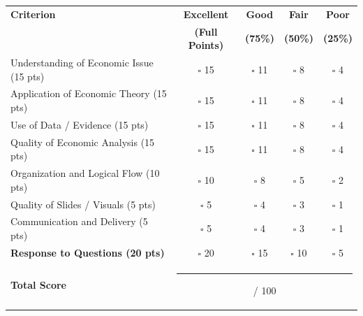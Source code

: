 \documentclass[12pt]{article}
\begin{document}
\begin{center}

\renewcommand{\arraystretch}{1.4}

\begin{tabular}{p{6cm}cccc}
\toprule
\textbf{Criterion} & \textbf{Excellent} & \textbf{Good} & \textbf{Fair} & \textbf{Poor} \\
 & \textbf{(Full Points)} & \textbf{(75\%)} & \textbf{(50\%)} & \textbf{(25\%)} \\
\midrule

Understanding of Economic Issue (15 pts)
& $\square$ 15 & $\square$ 11 & $\square$ 8 & $\square$ 4 \\

Application of Economic Theory (15 pts)
& $\square$ 15 & $\square$ 11 & $\square$ 8 & $\square$ 4 \\

Use of Data / Evidence (15 pts)
& $\square$ 15 & $\square$ 11 & $\square$ 8 & $\square$ 4 \\

Quality of Economic Analysis (15 pts)
& $\square$ 15 & $\square$ 11 & $\square$ 8 & $\square$ 4 \\

Organization and Logical Flow (10 pts)
& $\square$ 10 & $\square$ 8 & $\square$ 5 & $\square$ 2 \\

Quality of Slides / Visuals (5 pts)
& $\square$ 5 & $\square$ 4 & $\square$ 3 & $\square$ 1 \\

Communication and Delivery (5 pts)
& $\square$ 5 & $\square$ 4 & $\square$ 3 & $\square$ 1 \\

\textbf{Response to Questions (20 pts)}
& $\square$ 20 & $\square$ 15 & $\square$ 10 & $\square$ 5 \\

\midrule

\textbf{Total Score} & \multicolumn{4}{c}{\rule{6cm}{0.4pt} / 100} \\

\bottomrule
\end{tabular}

\end{center}

\vspace{1cm}



\vspace{4cm}
\end{document}
